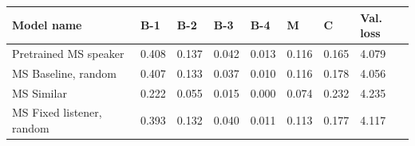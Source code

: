 \begin{table}[]
	\begin{tabularx}{\textwidth}{|X|l|l|l|l|l|l|l|}
		\hline
		\textbf{Model name}                                    & \textbf{B-1} & \textbf{B-2} & \textbf{B-3} & \textbf{B-4} & \textbf{M} & \textbf{C} & \textbf{Val. loss} \\ \hline
		Pretrained MS speaker                             & 0.408           & 0.137           & 0.042           & 0.013           & 0.116           & 0.165          & 4.079                    \\ \hline
		MS Baseline, random   & 0.407           & 0.133           & 0.037           & 0.010           & 0.116           & 0.178          & 4.056                    \\ \hline
		MS Similar  &     0.222    &          0.055       &       0.015         &        0.000         &   0.074              &      0.232         &      4.235                    \\ \hline
		MS Fixed listener, random  &        0.393         &       0.132          &        0.040         &      0.011           &      0.113           &        0.177        &       4.117                   \\ \hline

\end{tabularx}
\end{table}
